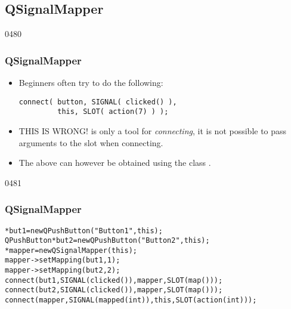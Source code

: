 %
%
%
%

\subsection{QSignalMapper}

\begin{slide}[fragile]{0480}\frametitle{QSignalMapper}
\label{qsignalmapper}
\begin{itemize}
  \item Beginners often try to do the following:
\begin{verbatim}
connect( button, SIGNAL( clicked() ), 
         this, SLOT( action(7) ) );
\end{verbatim}
  \item THIS IS WRONG!  is only a tool for
    \textit{connecting}, it is not possible to pass arguments to the slot
    when connecting.
  \item The above can however be obtained using the class
    .
  \end{itemize}
\end{slide}
\begin{slide}[fragile]{0481}\frametitle{QSignalMapper}
\small
\begin{alltt}
* but1 = new QPushButton("Button 1", this);
QPushButton* but2 = new QPushButton("Button 2", this);
* mapper = new QSignalMapper( this );
mapper->setMapping( but1, 1 );
mapper->setMapping( but2, 2 );
connect(but1, SIGNAL(clicked()), mapper, SLOT(map()));
connect(but2, SIGNAL(clicked()), mapper, SLOT(map()));
connect(mapper, SIGNAL(mapped(int)), this, SLOT(action(int)));
\end{alltt}
\end{slide}
